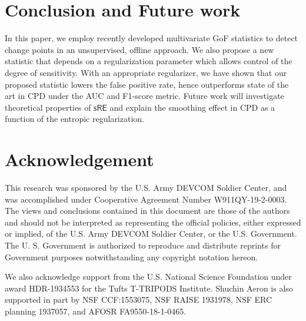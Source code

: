 \documentclass{article}
\begin{document}
\section{Conclusion and Future work}
\label{sec:foot}
In this paper, we employ recently developed multivariate GoF statistics to detect change points in an unsupervised, offline approach. We also propose a new statistic that depends on a regularization parameter which allows control of the degree of sensitivity. With an appropriate regularizer, we have shown that our proposed statistic lowers the false positive rate, hence outperforms state of the art in CPD under the AUC and F1-score metric. Future work will investigate theoretical properties of $\mathsf{sRE}$ and explain the smoothing effect in CPD as a function of the entropic regularization.

\clearpage
\section{Acknowledgement}
This research was sponsored by the U.S. Army DEVCOM Soldier Center, and was accomplished under Cooperative Agreement Number W911QY-19-2-0003. The views and conclusions contained in this document are those of the authors and should not be interpreted as representing the official policies, either expressed or implied, of the U.S. Army DEVCOM Soldier Center, or the U.S. Government. The U. S. Government is authorized to reproduce and distribute reprints for Government purposes notwithstanding any copyright notation hereon.

We also acknowledge support from the U.S. National Science Foundation under award HDR-1934553 for the Tufts T-TRIPODS Institute.  Shuchin Aeron is also supported in part by NSF CCF:1553075, NSF RAISE 1931978, NSF ERC planning 1937057, and AFOSR FA9550-18-1-0465.

% 

\end{document}
